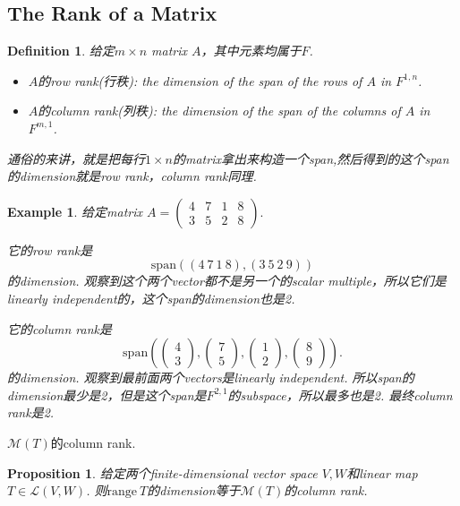 \documentclass{article}
\newtheorem{proposition}[theorem]{Proposition}
\newtheorem{example}[theorem]{Example}
\newtheorem{definition}[theorem]{Definition}
\newcommand\range[1]{\text{range}\ #1}
\begin{document}
\newpage
\subsection{The Rank of a Matrix}

\begin{definition}
\rm 给定$m \times n$ matrix $A$，其中元素均属于$F$.
\begin{itemize}
	\item $A$的row rank(行秩): the dimension of the span of the rows of $A$ in $F^{1,n}$.
	\item $A$的column rank(列秩): the dimension of the span of the columns of $A$ in $F^{m,1}$.
\end{itemize}
通俗的来讲，就是把每行$1 \times n$的matrix拿出来构造一个span,然后得到的这个span的dimension就是row rank，column rank同理.
\end{definition}

\begin{example}
\rm 给定matrix $A=\begin{pmatrix} 4&7&1&8 \\ 3&5&2&8 \end{pmatrix}.$

它的row rank是
$$
\text{span}((4\ 7\ 1\ 8),(3\ 5\ 2\ 9))
$$
的dimension. 观察到这个两个vector都不是另一个的scalar multiple，所以它们是linearly independent的，这个span的dimension也是2.

它的column rank是
$$
\text{span}\left(\begin{pmatrix}4\\3\end{pmatrix},\begin{pmatrix}7\\5\end{pmatrix},\begin{pmatrix}1\\2\end{pmatrix},\begin{pmatrix}8\\9\end{pmatrix}\right).
$$
的dimension. 观察到最前面两个vectors是linearly independent. 所以span的dimension最少是2，但是这个span是$F^{2,1}$的subspace，所以最多也是2. 最终column rank是2.
\end{example}

{\color{red} $\mathcal{M}(T)$的column rank}.

\begin{proposition}\label{rank: prop1}
\rm 给定两个finite-dimensional vector space $V,W$和linear map $T \in \mathcal{L}(V,W)$. 则$\range{T}$的dimension等于$\mathcal{M}(T)$的column rank.
\end{proposition}
\end{document}
